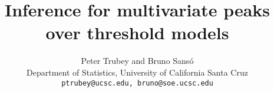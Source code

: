 \documentclass[12pt]{article}
\title{Inference for multivariate peaks over threshold models}
\author{Peter Trubey and Bruno Sans\'o\\
Department of Statistics, University of California Santa Cruz\\
{\tt ptrubey@ucsc.edu, bruno@soe.ucsc.edu}}
\begin{document}
\maketitle
\thispagestyle{empty}
\begin{abstract}
  
\end{abstract}















\end{document}
